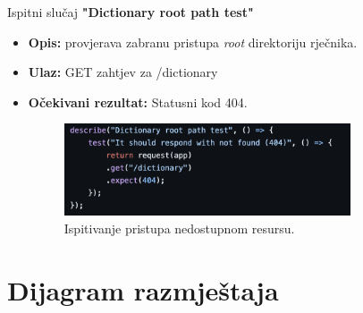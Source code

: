 			Ispitni slučaj \textbf{"Dictionary root path test"}
			\begin{itemize}
				\item \textbf{Opis:} provjerava zabranu pristupa \textit{root} direktoriju rječnika.
				\item \textbf{Ulaz:} GET zahtjev za /dictionary
				\item \textbf{Očekivani rezultat:} Statusni kod 404.
				\begin{figure}[h]
					\centering
					\includegraphics[width=0.8\textwidth]{slike/testovi/admin_404_test.png}
					\caption{Ispitivanje pristupa nedostupnom resursu.}
					\label{fig:testovi_admin_slika}
				\end{figure}
			\end{itemize}
			
			\eject 
		
		
		\section{Dijagram razmještaja}
			
